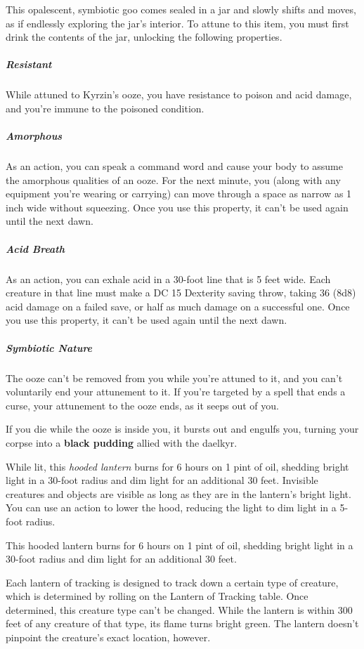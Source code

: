 \documentclass[10pt,a4paper,twoside,bg=print,twocolumn,openany,nodeprecatedcode]{dndbook}
\begin{document}
This opalescent, symbiotic goo comes sealed in a jar and slowly shifts and moves, as if endlessly exploring the jar's interior. To attune to this item, you must first drink the contents of the jar, unlocking the following properties.

\subparagraph{Resistant}
While attuned to Kyrzin's ooze, you have resistance to poison and acid damage, and you're immune to the poisoned condition.

\subparagraph{Amorphous}
As an action, you can speak a command word and cause your body to assume the amorphous qualities of an ooze. For the next minute, you (along with any equipment you're wearing or carrying) can move through a space as narrow as 1 inch wide without squeezing. Once you use this property, it can't be used again until the next dawn.

\subparagraph{Acid Breath}
As an action, you can exhale acid in a 30-foot line that is 5 feet wide. Each creature in that line must make a DC 15 Dexterity saving throw, taking 36 (8d8) acid damage on a failed save, or half as much damage on a successful one. Once you use this property, it can't be used again until the next dawn.

\subparagraph{Symbiotic Nature}
The ooze can't be removed from you while you're attuned to it, and you can't voluntarily end your attunement to it. If you're targeted by a spell that ends a curse, your attunement to the ooze ends, as it seeps out of you.

If you die while the ooze is inside you, it bursts out and engulfs you, turning your corpse into a \textbf{black pudding} allied with the daelkyr.

While lit, this \textit{hooded lantern} burns for 6 hours on 1 pint of oil, shedding bright light in a 30-foot radius and dim light for an additional 30 feet. Invisible creatures and objects are visible as long as they are in the lantern's bright light. You can use an action to lower the hood, reducing the light to dim light in a 5-foot radius.

This hooded lantern burns for 6 hours on 1 pint of oil, shedding bright light in a 30-foot radius and dim light for an additional 30 feet.

Each lantern of tracking is designed to track down a certain type of creature, which is determined by rolling on the Lantern of Tracking table. Once determined, this creature type can't be changed. While the lantern is within 300 feet of any creature of that type, its flame turns bright green. The lantern doesn't pinpoint the creature's exact location, however.
\end{document}
